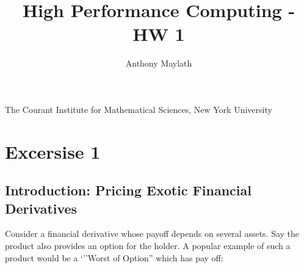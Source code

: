 \documentclass[12pt]{article}
\title{High Performance Computing - HW 1}
\author{Anthony Maylath}
\begin{document}
\maketitle

\begin{center}

The Courant Institute for Mathematical Sciences, New York University \\ 

\end{center}


\setcounter{MaxMatrixCols}{13}

\newpage

\section{Excersise 1}

\subsection{Introduction: Pricing Exotic Financial Derivatives}

Consider a financial derivative whose payoff depends on several assets. Say the product also provides an option for the holder. A popular example of such a product would be a `''Worst of Option'' which has pay off:
\end{document}
